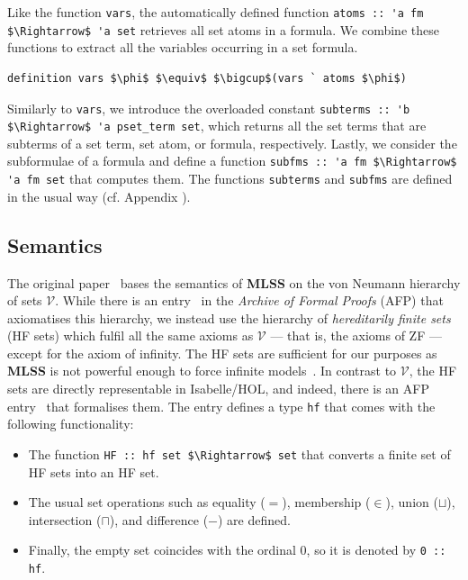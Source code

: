 \documentclass[runningheads]{llncs}
\newcommand{\MLSS}{\textbf{MLSS}}
\newcommand{\hfmem}{\boldsymbol{\in}}
\begin{document}
Like the function \lstinline!vars!, the automatically defined function \lstinline!atoms :: 'a fm $\Rightarrow$ 'a set! retrieves all set atoms in a formula.
We combine these functions to extract all the variables occurring in a set formula.
\begin{lstlisting}
definition vars $\phi$ $\equiv$ $\bigcup$(vars ` atoms $\phi$)
\end{lstlisting}

Similarly to \lstinline!vars!, we introduce the overloaded constant \lstinline!subterms :: 'b $\Rightarrow$ 'a pset_term set!, which returns all the set terms that are subterms of a set term, set atom, or formula, respectively. Lastly, we consider the subformulae of a formula and define a function \lstinline!subfms :: 'a fm $\Rightarrow$ 'a fm set! that computes them.
The functions \lstinline!subterms! and \lstinline!subfms! are defined in the usual way (cf. Appendix ).

\subsection{Semantics}
The original paper~\cite{new_fast_tableau} bases the semantics of \MLSS{} on the von Neumann hierarchy of sets $\mathcal{V}$. 
While there is an entry~\cite{zfc_in_hol_afp} in the \textit{Archive of Formal Proofs} (AFP) that axiomatises this hierarchy,
we instead use the hierarchy of \textit{hereditarily finite sets} (HF sets) which fulfil all the same axioms as $\mathcal{V}$ --- that is, the axioms of ZF --- except for the axiom of infinity.
The HF sets are sufficient for our purposes as \MLSS{} is not powerful enough to force infinite models~\cite[Chapter~14.2]{set_theory}.
In contrast to $\mathcal{V}$, the HF sets are directly representable in Isabelle/HOL, and indeed, there is an AFP entry~\cite{hf_AFP} that formalises them.
The entry defines a type \lstinline!hf! that comes with the following functionality:
\begin{itemize}
  \item The function \lstinline!HF :: hf set $\Rightarrow$ set! that converts a finite set of HF sets into an HF set.
\item The usual set operations such as equality ($=$), membership ($\hfmem$), union ($\sqcup$), intersection ($\sqcap$), and difference ($-$) are defined.
\item Finally, the empty set coincides with the ordinal $0$, so it is denoted by \lstinline!0 :: hf!.
\end{itemize}
\end{document}
